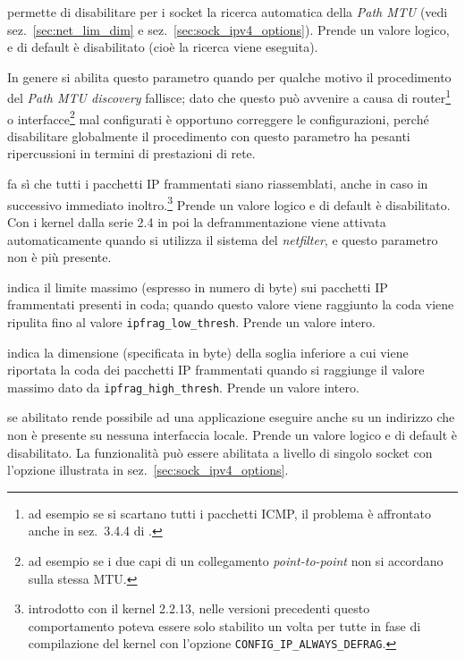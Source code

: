 \begin{basedescript}{\desclabelwidth{2.2cm}\desclabelstyle{\nextlinelabel}}
\item[\sysctlrelfiled{net/ipv4}{ip\_no\_pmtu\_disc}] permette di disabilitare
  per i socket  la ricerca automatica della \textit{Path
    MTU} (vedi sez.~\ref{sec:net_lim_dim} e
  sez.~\ref{sec:sock_ipv4_options}). Prende un valore logico, e di default è
  disabilitato (cioè la ricerca viene eseguita).

  In genere si abilita questo parametro quando per qualche motivo il
  procedimento del \textit{Path MTU discovery} fallisce; dato che questo può
  avvenire a causa di router\footnote{ad esempio se si scartano tutti i
    pacchetti ICMP, il problema è affrontato anche in sez.~3.4.4 di
    \cite{SGL}.} o interfacce\footnote{ad esempio se i due capi di un
    collegamento \textit{point-to-point} non si accordano sulla stessa MTU.}
  mal configurati è opportuno correggere le configurazioni, perché
  disabilitare globalmente il procedimento con questo parametro ha pesanti
  ripercussioni in termini di prestazioni di rete.

\item[\sysctlrelfiled{net/ipv4}{ip\_always\_defrag}] fa sì che tutti i
  pacchetti IP frammentati siano riassemblati, anche in caso in successivo
  immediato inoltro.\footnote{introdotto con il kernel 2.2.13, nelle versioni
    precedenti questo comportamento poteva essere solo stabilito un volta per
    tutte in fase di compilazione del kernel con l'opzione
    \texttt{CONFIG\_IP\_ALWAYS\_DEFRAG}.} Prende un valore logico e di default
  è disabilitato. Con i kernel dalla serie 2.4 in poi la deframmentazione
  viene attivata automaticamente quando si utilizza il sistema del
  \textit{netfilter}, e questo parametro non è più presente.

\item[\sysctlrelfiled{net/ipv4}{ipfrag\_high\_thresh}] indica il limite
  massimo (espresso in numero di byte) sui pacchetti IP frammentati presenti
  in coda; quando questo valore viene raggiunto la coda viene ripulita fino al
  valore \texttt{ipfrag\_low\_thresh}. Prende un valore intero.

\item[\sysctlrelfiled{net/ipv4}{ipfrag\_low\_thresh}] indica la dimensione
  (specificata in byte) della soglia inferiore a cui viene riportata la coda
  dei pacchetti IP frammentati quando si raggiunge il valore massimo dato da
  \texttt{ipfrag\_high\_thresh}. Prende un valore intero.

\item[\sysctlrelfiled{net/ipv4}{ip\_nonlocal\_bind}] se abilitato rende
  possibile ad una applicazione eseguire  anche su un indirizzo che
  non è presente su nessuna interfaccia locale. Prende un valore logico e di
  default è disabilitato. La funzionalità può essere abilitata a livello di
  singolo socket con l'opzione  illustrata in
  sez.~\ref{sec:sock_ipv4_options}. 


\end{basedescript}
